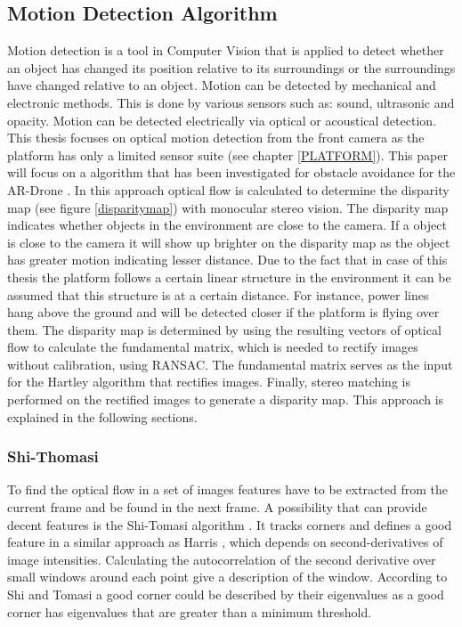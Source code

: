 \documentclass[a4paper]{article}
\begin{document}
\subsection{Motion Detection Algorithm}
\label{MOTION_DETECTION}
Motion detection is a tool in Computer Vision that is applied to detect whether an object has changed its position relative to its surroundings or the surroundings have changed relative to an object. Motion can be detected by mechanical and electronic methods. This is done by various sensors such as: sound, ultrasonic and opacity. Motion can be detected electrically via optical or acoustical detection. This thesis focuses on optical motion detection from the front camera as the platform has only a limited sensor suite (see chapter \ref{PLATFORM}). This paper will focus on a algorithm that has been investigated for obstacle avoidance for the AR-Drone \cite{Jurriaans2011}. In this approach optical flow is calculated to determine the disparity map (see figure \ref{disparitymap}) with monocular stereo vision. The disparity map indicates whether objects in the environment are close to the camera. If a object is close to the camera it will show up brighter on the disparity map as the object has greater motion indicating lesser distance. Due to the fact that in case of this thesis the platform follows a certain linear structure in the environment it can be assumed that this structure is at a certain distance. For instance, power lines hang above the ground and will be detected closer if the platform is flying over them.
The disparity map is determined by using the resulting vectors of optical flow to calculate the fundamental matrix, which is needed to rectify images without calibration, using RANSAC. The fundamental matrix serves as the input for the Hartley algorithm that rectifies images. Finally, stereo matching is performed on the rectified images to generate a disparity map. This approach is explained in the following sections.

\subsubsection{Shi-Thomasi}
To find the optical flow in a set of images features have to be extracted from the current frame and be found in the next frame. A possibility that can provide decent features is the Shi-Tomasi algorithm \cite{Shi1994}. It tracks corners and defines a good feature in a similar approach as Harris \cite{Harris1988}, which depends on second-derivatives of image intensities. Calculating the autocorrelation of the second derivative over small windows around each point give a description of the window. According to Shi and Tomasi a good corner could be described by their eigenvalues as a good corner has eigenvalues that are greater than a minimum threshold.
\end{document}
